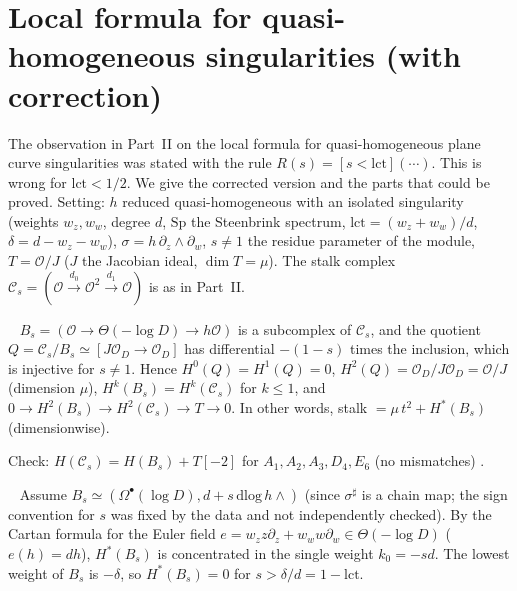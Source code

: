 \section{Local formula for quasi-homogeneous singularities (with correction)}\label{sec:local}
The observation in Part~II on the local formula for quasi-homogeneous plane curve singularities was stated with the rule $R(s)=[s<\mathrm{lct}](\cdots)$. This is wrong for $\mathrm{lct}<1/2$. We give the corrected version and the parts that could be proved. Setting: $h$ reduced quasi-homogeneous with an isolated singularity (weights $w_z,w_w$, degree $d$, $\mathrm{Sp}$ the Steenbrink spectrum, $\mathrm{lct}=(w_z+w_w)/d$, $\delta=d-w_z-w_w$), $\sigma=h\,\partial_z\wedge\partial_w$, $s\ne1$ the residue parameter of the module, $T=\mathcal O/J$ ($J$ the Jacobian ideal, $\dim T=\mu$). The stalk complex $\mathcal C_s=(\mathcal O\xrightarrow{d_0}\mathcal O^2\xrightarrow{d_1}\mathcal O)$ is as in Part~II.
\begin{prop}\tP\ \tV\label{prop:Q}
$B_s=(\mathcal O\to\Theta(-\log D)\to h\mathcal O)$ is a subcomplex of $\mathcal C_s$, and the quotient $Q=\mathcal C_s/B_s\simeq[J\mathcal O_D\to\mathcal O_D]$ has differential $-(1-s)$ times the inclusion, which is injective for $s\ne1$. Hence $H^0(Q)=H^1(Q)=0$, $H^2(Q)=\mathcal O_D/J\mathcal O_D=\mathcal O/J$ (dimension $\mu$), $H^k(B_s)=H^k(\mathcal C_s)$ for $k\le1$, and $0\to H^2(B_s)\to H^2(\mathcal C_s)\to T\to0$. In other words, stalk $=\mu\,t^2+H^*(B_s)$ (dimensionwise).
\end{prop}
\noindent Check: $H(\mathcal C_s)=H(B_s)+T[-2]$ for $A_1,A_2,A_3,D_4,E_6$ (no mismatches) \tV.
\begin{prop}\tP\ \tQ\label{prop:weight}
Assume $B_s\simeq(\Omega^\bullet(\log D),d+s\,\mathrm{dlog}\,h\wedge)$ (since $\sigma^\sharp$ is a chain map; the sign convention for $s$ was fixed by the data and not independently checked). By the Cartan formula for the Euler field $e=w_zz\partial_z+w_ww\partial_w\in\Theta(-\log D)$ ($e(h)=dh$), $H^*(B_s)$ is concentrated in the single weight $k_0=-sd$. The lowest weight of $B_s$ is $-\delta$, so $H^*(B_s)=0$ for $s>\delta/d=1-\mathrm{lct}$.
\end{prop}
